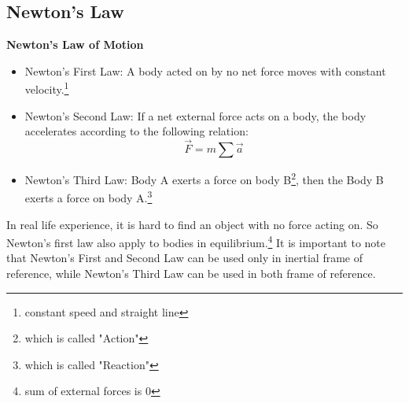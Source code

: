 \documentclass[10pt, a4paper]{article}
\begin{document}
\subsection{Newton's Law}
\begin{principle}
    \textbf{Newton's Law of Motion}
    \begin{itemize}
        \item Newton's First Law: A body acted on by no net force moves with constant velocity.\footnote{constant speed and straight line}
        \item Newton's Second Law: If a net external force acts on a body, the body accelerates according to the following relation:
    $$
    \vec{F} = m\sum \vec{a}
    $$
        \item Newton's Third Law: Body A exerts a force on body B\footnote{which is called "Action"}, then the Body B exerts a force on body A.\footnote{which is called "Reaction"}
    \end{itemize}
\end{principle}
In real life experience, it is hard to find an object with no force acting on. So Newton's first law also apply to bodies in equilibrium.\footnote{sum of external forces is 0} It is important to note that Newton's First and Second Law can be used only in inertial frame of reference, while Newton's Third Law can be used in both frame of reference.\\
\end{document}
